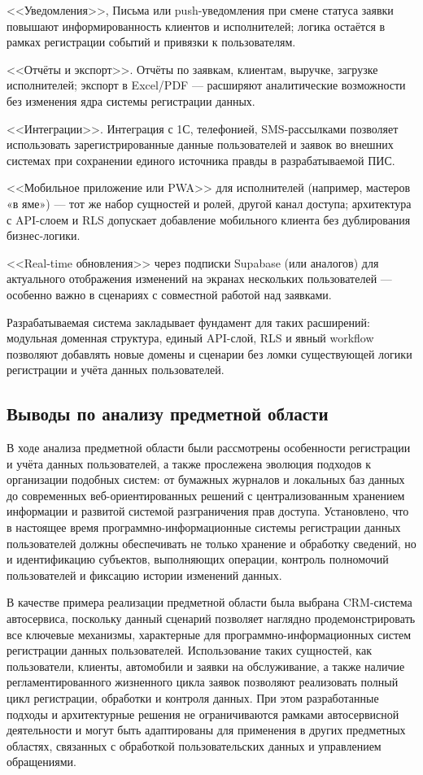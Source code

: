 <<Уведомления>>, Письма или push-уведомления при смене статуса заявки повышают информированность клиентов и исполнителей; логика остаётся в рамках регистрации событий и привязки к пользователям.

<<Отчёты и экспорт>>.  Отчёты по заявкам, клиентам, выручке, загрузке исполнителей; экспорт в Excel/PDF — расширяют аналитические возможности без изменения ядра системы регистрации данных.

<<Интеграции>>.  Интеграция с 1С, телефонией, SMS-рассылками позволяет использовать зарегистрированные данные пользователей и заявок во внешних системах при сохранении единого источника правды в разрабатываемой ПИС.

<<Мобильное приложение или PWA>>  для исполнителей (например, мастеров «в яме») — тот же набор сущностей и ролей, другой канал доступа; архитектура с API-слоем и RLS допускает добавление мобильного клиента без дублирования бизнес-логики.

<<Real-time обновления>> через подписки Supabase (или аналогов) для актуального отображения изменений на экранах нескольких пользователей — особенно важно в сценариях с совместной работой над заявками.

Разрабатываемая система закладывает фундамент для таких расширений: модульная доменная структура, единый API-слой, RLS и явный workflow позволяют добавлять новые домены и сценарии без ломки существующей логики регистрации и учёта данных пользователей.

\subsection{Выводы по анализу предметной области}

В ходе анализа предметной области были рассмотрены особенности регистрации и учёта данных пользователей, а также прослежена эволюция подходов к организации подобных систем: от бумажных журналов и локальных баз данных до современных веб-ориентированных решений с централизованным хранением информации и развитой системой разграничения прав доступа. Установлено, что в настоящее время программно-информационные системы регистрации данных пользователей должны обеспечивать не только хранение и обработку сведений, но и идентификацию субъектов, выполняющих операции, контроль полномочий пользователей и фиксацию истории изменений данных.

В качестве примера реализации предметной области была выбрана CRM-система автосервиса, поскольку данный сценарий позволяет наглядно продемонстрировать все ключевые механизмы, характерные для программно-информационных систем регистрации данных пользователей. Использование таких сущностей, как пользователи, клиенты, автомобили и заявки на обслуживание, а также наличие регламентированного жизненного цикла заявок позволяют реализовать полный цикл регистрации, обработки и контроля данных. При этом разработанные подходы и архитектурные решения не ограничиваются рамками автосервисной деятельности и могут быть адаптированы для применения в других предметных областях, связанных с обработкой пользовательских данных и управлением обращениями.

